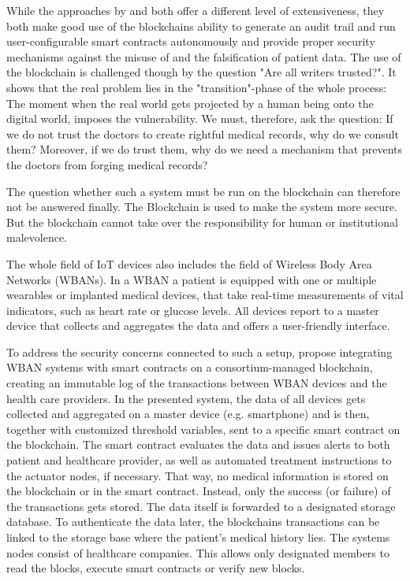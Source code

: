 While the approaches by \cite{Cao2019} and \cite{Azaria2016} both offer a different level of extensiveness, they both make good use of the blockchains ability to generate an audit trail and run user-configurable smart contracts autonomously and provide proper security mechanisms against the misuse of and the falsification of patient data.
The use of the blockchain is challenged though by the question "Are all writers trusted?"\cite{Wust2017}. It shows that the real problem lies in the "transition"-phase of the whole process: The moment when the real world gets projected by a human being onto the digital world, imposes the vulnerability. We must, therefore, ask the question: If we do not trust the doctors to create rightful medical records, why do we consult them? Moreover, if we do trust them, why do we need a mechanism that prevents the doctors from forging medical records?

The question whether such a system must be run on the blockchain can therefore not be answered finally. The Blockchain is used to make the system more secure. But the blockchain cannot take over the responsibility for human or institutional malevolence.

The whole field of IoT devices also includes the field of Wireless Body Area Networks (WBANs). In a WBAN a patient is equipped with one or multiple wearables or implanted medical devices, that take real-time measurements of vital indicators, such as heart rate or glucose levels. All devices report to a master device that collects and aggregates the data and offers a user-friendly interface.

To address the security concerns connected to such a setup, \citeauthor{Baccarini2018} propose integrating WBAN systems with smart contracts on a consortium-managed blockchain, creating an immutable log of the transactions between WBAN devices and the health care providers. \cite{Baccarini2018} 
In the presented system, the data of all devices gets collected and aggregated on a master device (e.g. smartphone) and is then, together with customized threshold variables, sent to a specific smart contract on the blockchain. The smart contract evaluates the data and issues alerts to both patient and healthcare provider, as well as automated treatment instructions to the actuator nodes, if necessary.
That way, no medical information is stored on the blockchain or in the smart contract. Instead, only the success (or failure) of the transactions gets stored. The data itself is forwarded to a designated storage database.
To authenticate the data later, the blockchains transactions can be linked to the storage base where the patient's medical history lies.
The systems nodes consist of healthcare companies. This allows only designated members to read the blocks, execute smart contracts or verify new blocks.

